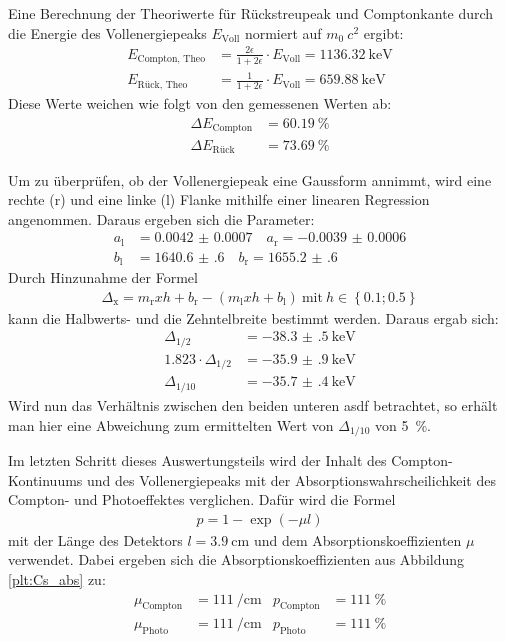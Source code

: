 Eine Berechnung der Theoriwerte für Rückstreupeak und Comptonkante durch die
Energie des Vollenergiepeaks $E_{\text{Voll}}$ normiert auf $m_0\:c^2$ ergibt:
\begin{align*}
  E_\text{Compton, Theo} &= \frac{2\epsilon}{1+2\epsilon}\cdot E_\text{Voll} = \SI{1136.32}{\kilo\electronvolt} \\
  E_\text{Rück, Theo} &= \frac{1}{1+2\epsilon}\cdot E_\text{Voll} = \SI{659.88}{\kilo\electronvolt}
\end{align*}
Diese Werte weichen wie folgt von den gemessenen Werten ab:
\begin{align*}
  \Delta E_\text{Compton} &= \SI{60.19}{\percent} \\
  \Delta E_\text{Rück} &= \SI{73.69}{\percent}
\end{align*}

Um zu überprüfen, ob der Vollenergiepeak eine Gaussform annimmt, wird eine
rechte (r) und eine linke (l) Flanke mithilfe einer linearen Regression
angenommen. Daraus ergeben sich die Parameter:
\begin{align*}
  a_\text{l} &= \num{0.0042(7)} \quad a_\text{r} = \num{-0.0039(6)} \\
  b_\text{l} &= \num{1640.6(6)} \quad b_\text{r} = \num{1655.2(6)}
\end{align*}
Durch Hinzunahme der Formel
\begin{align*}
	\Delta_\text{x} = m_\text{r}xh + b_\text{r} - \left(m_\text{l}xh + b_\text{l}\right)\ \text{mit}\ h \in \left\{\num{0.1}; \num{0.5}\right\}
\end{align*}
kann die Halbwerts- und die Zehntelbreite bestimmt werden. Daraus ergab sich:
\begin{align*}
  \Delta_{1/2} &= \SI{-38.3(5)}{\kilo\electronvolt} \\
	\num{1.823} \cdot \Delta_{1/2} &= \SI{-35.9(9)}{\kilo\electronvolt} \\
  \Delta_{1/10} &= \SI{-35.7(4)}{\kilo\electronvolt}
\end{align*}
Wird nun das Verhältnis zwischen den beiden unteren asdf  %
betrachtet, so erhält man hier eine Abweichung zum ermittelten Wert von
$\Delta_{1/10}$ von \SI{5}{\percent}.

Im letzten Schritt dieses Auswertungsteils wird der Inhalt des Compton-Kontinuums
und des Vollenergiepeaks mit der Absorptionswahrscheilichkeit des Compton- und
Photoeffektes verglichen. Dafür wird die Formel
\begin{align*}
	p = 1 - \exp\left(-\mu l\right)
\end{align*}
mit der Länge des Detektors $l = \SI{3.9}{\centi\meter}$ und dem
Absorptionskoeffizienten $\mu$ verwendet. Dabei ergeben sich die
Absorptionskoeffizienten aus Abbildung \ref{plt:Cs_abs} zu:
\begin{align*}
	\mu_\text{Compton} &= \SI{111}{\per\centi\meter} & p_\text{Compton} &= \SI{111}{\percent} \\
	\mu_\text{Photo} &= \SI{111}{\per\centi\meter} & p_\text{Photo} &= \SI{111}{\percent}
\end{align*}

